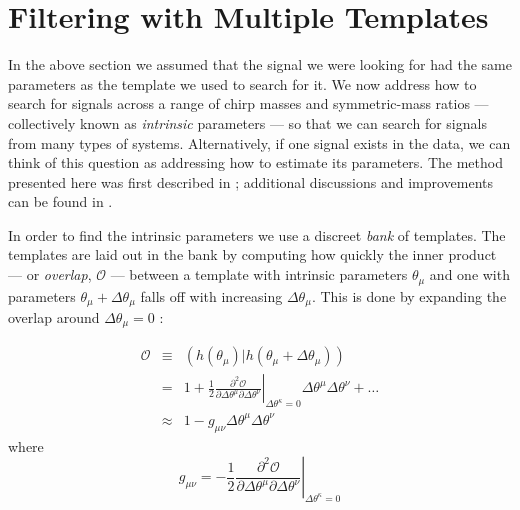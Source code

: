 \section{Filtering with Multiple Templates}
\label{sec:multiple_templates}
In the above section we assumed that the signal we were looking for had the same parameters as the template we used to search for it. We now address how to search for signals across a range of chirp masses and symmetric-mass ratios --- collectively known as \emph{intrinsic} parameters --- so that we can search for signals from many types of systems. Alternatively, if one signal exists in the data, we can think of this question as addressing how to estimate its parameters. The method presented here was first described in \cite{Owen:1995tm}; additional discussions and improvements can be found in \cite{Owen:1998dk, Tanaka:2000, BBCCS:2006, hexabank}.

In order to find the intrinsic parameters we use a discreet \emph{bank} of templates. The templates are laid out in the bank by computing how quickly the inner product --- or \emph{overlap}, $\mathcal{O}$ --- between a template with intrinsic parameters $\theta_\mu$ and one with parameters $\theta_\mu + \Delta\theta_\mu$ falls off with increasing $\Delta\theta_\mu$. This is done by expanding the overlap around $\Delta\theta_\mu = 0$ \cite{Owen:1995tm, Owen:1998dk, BBCCS:2006}:

\begin{eqnarray}
\label{eqn:OverlapSeries}
\mathcal{O} & \equiv & \left( h(\theta_\mu) | h(\theta_\mu + \Delta\theta_\mu) \right)  \\
        & = & 1 + \frac{1}{2} \left.\frac{\partial^2\mathcal{O}}{\partial \Delta\theta^\mu \partial \Delta\theta^\nu} \right|_{\Delta\theta^\kappa = 0} \Delta\theta^\mu \Delta\theta^\nu + \ldots \nonumber \\
        & \approx & 1 - g_{\mu \nu}\Delta\theta^\mu\Delta\theta^\nu
\end{eqnarray}
where 
\begin{equation}
\label{eqn:templateMetric}
g_{\mu \nu} = -\frac{1}{2} \left.\frac{\partial^2\mathcal{O}}{\partial \Delta\theta^\mu \partial \Delta\theta^\nu} \right|_{\Delta\theta^\kappa = 0}
\end{equation}

